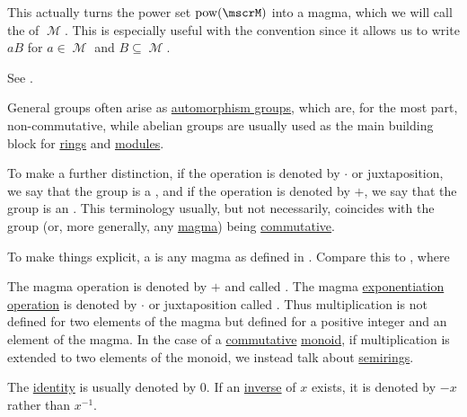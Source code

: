 \begin{definition}
\begin{thmenum}
    This actually turns the power set \( \pow(\mscrM) \) into a magma, which we will call the  of \( \mscrM \). This is especially useful with the convention  since it allows us to write \( aB \) for \( a \in \mscrM \) and \( B \subseteq \mscrM \).

    See .
  \end{thmenum}
\end{definition}

\begin{remark}\label{rem:additive_magma}
  General groups often arise as \hyperref[def:automorphism_group]{automorphism groups}, which are, for the most part, non-commutative, while abelian groups are usually used as the main building block for \hyperref[def:semiring/ring]{rings} and \hyperref[def:left_module]{modules}.

  To make a further distinction, if the operation is denoted by \( \cdot \) or juxtaposition, we say that the group is a , and if the operation is denoted by \( + \), we say that the group is an . This terminology usually, but not necessarily, coincides with the group (or, more generally, any \hyperref[def:magma]{magma}) being \hyperref[def:magma/commutative]{commutative}.

  To make things explicit, a  is any magma as defined in . Compare this to , where
  \begin{thmenum}
     The magma operation is denoted by \( + \) and called .
     The magma \hyperref[def:magma/exponentiation]{exponentiation operation} is denoted by \( \cdot \) or juxtaposition called . Thus multiplication is not defined for two elements of the magma but defined for a positive integer and an element of the magma. In the case of a \hyperref[def:magma/commutative]{commutative} \hyperref[def:unital_magma/associative]{monoid}, if multiplication is extended to two elements of the monoid, we instead talk about \hyperref[def:semiring]{semirings}.

     The \hyperref[def:magma_identity]{identity} is usually denoted by \( 0 \).
     If an \hyperref[def:unital_magma_inverse_element]{inverse} of \( x \) exists, it is denoted by \( -x \) rather than \( x^{-1} \).
  \end{thmenum}
\end{remark}

